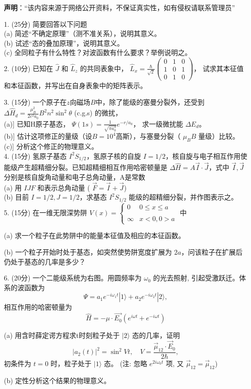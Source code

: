 
\textbf{声明}：“该内容来源于网络公开资料，不保证真实性，如有侵权请联系管理员”



1. (25分) 简要回答以下问题\\
(a) 简述“不确定原理”（测不准关系），说明其意义。\\
(b) 试述“态的叠加原理”，说明其意义。\\
(c) 全同粒子有什么特性？对波函数有什么要求？举例说明之。\\

2. (10分) 已知在 $\hat{J}$ 和 $\hat{L}_z$ 的共同表象中， $\hat{L}_x = \frac{\hbar}{\sqrt{2}} \begin{pmatrix} 
0 & 1 & 0 \\
1 & 0 & 1 \\
0 & 1 & 0 
\end{pmatrix}$， 试求其本征值和本征函数，并写出在自身表象中的矩阵表示。

3. (15分) 一个原子在$z$向磁场$B$中，除了能级的塞曼分裂外，还受到 $\Delta \hat{H}_d = \frac{\mu_B^2}{2c^2a_0} B^2 n^2 \sin^2 \theta$ (c.g.s) 的微扰，\\
(a)] 已知H原子基态， $\Psi (1s) = \frac{1}{\sqrt{\pi a_0^3}} e^{-r/a_0}$， 求一级微扰能 $ \Delta E_d$。\\
(b)] 估计这项修正的量级（设$B=10^4$高斯），与塞曼分裂（ $\mu_B B$ 量级）比较。\\
(c)] 分析这个修正的物理意义。\\

4. (15分) 氢原子基态 $I^2S_{1/2}$，氢原子核的自旋 $I=1/2$，核自旋与电子相互作用使能级产生超精细分裂。已知超精细相互作用哈密顿量是 $\Delta\hat H = A \vec{I} \cdot \vec{J}$，式中 $\vec{I}, \vec{J}$ 分别是核自旋角动量和电子总角动量，A是常数\\
(a) 用 $I J F$ 和表示总角动量 ( $\vec{F} = \vec{I} + \vec{J}$)\\
(b) 目前 $I = 1/2, J = 1/2$，求基态 $I^2S_{1/2}$ 能级的超精细分裂，并作图表示之。\\

5. (15分) 在一维无限深势阱 $V(x) = 
\begin{cases} 
0 & 0 \leq x \leq a \\\\
\infty & x < 0, 0 > a 
\end{cases}$
中

(a) 求一个粒子在此势阱中的能量本征值及相应的本征函数。

(b) 一个粒子开始时处于基态，如突然使势阱宽度扩展为 $2a$，问该粒子在扩展后仍处于基态的几率是多少？

6. (20分) 一个二能级系统为右图。用圆频率为 $\omega_0$ 的光去照射, 引起受激跃迁。体系的波函数为
$$\Psi = a_1 e^{-i \omega_1 t} |1\rangle + a_2 e^{-i \omega_2 t} |2\rangle,~$$
相互作用的哈密顿量为
$$\hat{H} = -\mu \cdot \vec{E_0}(e^{i \omega t} + e^{-i \omega t})~$$

(a) 用含时薛定谔方程求t时刻粒子处于 $|2\rangle$ 态的几率，证明
$$|a_2(t)|^2 = \sin^2 Vt, \quad V = \frac{\vec\mu_{12} \cdot\vec E_0}{2\hbar},~$$
初条件为 $t=0$ 时，粒子处于 $|1\rangle$ 态。 (注: 忽略 $e^{2i\omega_0 t}$ 项, 又 $\vec\mu_{12} =\vec\mu_{12}$)

(b) 定性分析这个结果的物理意义。
